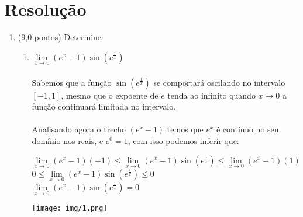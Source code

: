 \documentclass[12pt]{article}
\begin{document}
\part{Resolução}
\begin{enumerate}
	\item (9,0 pontos) Determine:
	\begin{enumerate}
		\item $ \lim\limits_{x \rightarrow 0}(e^x - 1) \sin({ e^\frac{1}{x}}) $ \\
		\\
		Sabemos que a função $\sin({ e^\frac{1}{x}})$ se comportará oscilando no intervalo $[-1,1]$, mesmo que o expoente de $e$ tenda ao infinito quando $x \rightarrow 0$ a função continuará limitada no intervalo.\\ \\
		Analisando agora o trecho $ (e^x - 1) $ temos que $e^x$ é contínuo no seu domínio nos reais, e $e^0 = 1$, com isso podemos inferir que:\\
		\begin{center}
			$ \lim\limits_{x \rightarrow 0}(e^x - 1)(-1) \le
			\lim\limits_{x \rightarrow 0}(e^x - 1) \sin({ e^\frac{1}{x}}) \le
			\lim\limits_{x \rightarrow 0}(e^x - 1)(1) $
			\\
			$ 0 \le \lim\limits_{x \rightarrow 0}(e^x - 1) \sin({ e^\frac{1}{x}}) \le 0 $
			\\
			$ \lim\limits_{x \rightarrow 0}(e^x - 1) \sin({ e^\frac{1}{x}}) = 0 $
		\end{center}
		
		\begin{center}
			\texttt{[image: img/1.png]}
		\end{center}
		

\end{enumerate}
\end{enumerate}
\end{document}
